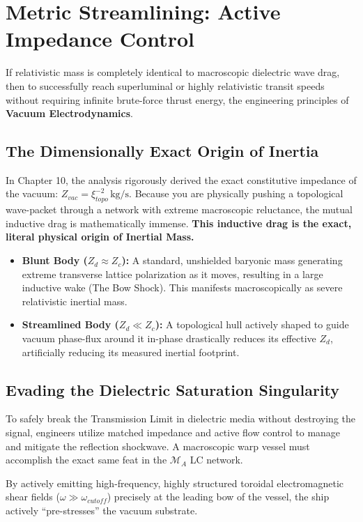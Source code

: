 \section{Metric Streamlining: Active Impedance Control}

If relativistic mass is completely identical to macroscopic dielectric wave drag, then to successfully reach superluminal or highly relativistic transit speeds without requiring infinite brute-force thrust energy, the engineering principles of \textbf{Vacuum Electrodynamics}.

\subsection{The Dimensionally Exact Origin of Inertia}
In Chapter 10, the analysis rigorously derived the exact constitutive impedance of the vacuum: $Z_{vac} = \xi_{topo}^{-2}\,\text{kg/s}$. Because you are physically pushing a topological wave-packet through a network with extreme macroscopic reluctance, the mutual inductive drag is mathematically immense. \textbf{This inductive drag is the exact, literal physical origin of Inertial Mass.}

\begin{itemize}
    \item \textbf{Blunt Body ($Z_d \approx Z_c$):} A standard, unshielded baryonic mass generating extreme transverse lattice polarization as it moves, resulting in a large inductive wake (The Bow Shock). This manifests macroscopically as severe relativistic inertial mass.
    \item \textbf{Streamlined Body ($Z_d \ll Z_c$):} A topological hull actively shaped to guide vacuum phase-flux around it in-phase drastically reduces its effective $Z_d$, artificially reducing its measured inertial footprint.
\end{itemize}

\subsection{Evading the Dielectric Saturation Singularity}
To safely break the Transmission Limit in dielectric media without destroying the signal, engineers utilize matched impedance and active flow control to manage and mitigate the reflection shockwave. A macroscopic warp vessel must accomplish the exact same feat in the $\mathcal{M}_A$ LC network.

By actively emitting high-frequency, highly structured toroidal electromagnetic shear fields ($\omega \gg \omega_{cutoff}$) precisely at the leading bow of the vessel, the ship actively ``pre-stresses'' the vacuum substrate. 

